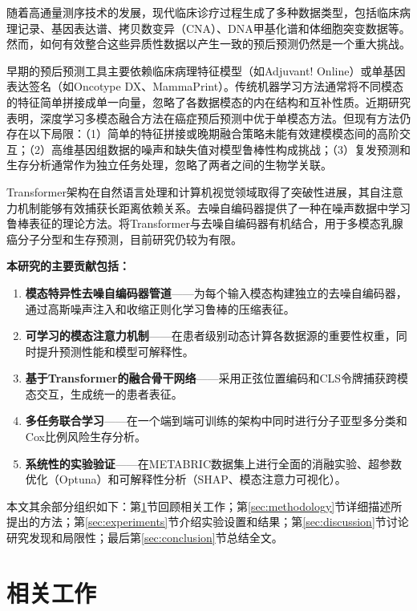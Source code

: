 \documentclass[conference]{IEEEtran}
\begin{document}
随着高通量测序技术的发展，现代临床诊疗过程生成了多种数据类型，包括临床病理记录、基因表达谱、拷贝数变异（CNA）、DNA甲基化谱和体细胞突变数据等。然而，如何有效整合这些异质性数据以产生一致的预后预测仍然是一个重大挑战。

早期的预后预测工具主要依赖临床病理特征模型（如Adjuvant! Online）或单基因表达签名（如Oncotype DX、MammaPrint）\cite{sparano2018adjuvant,cardoso201670gene}。传统机器学习方法通常将不同模态的特征简单拼接成单一向量，忽略了各数据模态的内在结构和互补性质。近期研究表明，深度学习多模态融合方法在癌症预后预测中优于单模态方法\cite{chen2022pan,huang2021multi}。但现有方法仍存在以下局限：（1）简单的特征拼接或晚期融合策略未能有效建模模态间的高阶交互；（2）高维基因组数据的噪声和缺失值对模型鲁棒性构成挑战；（3）复发预测和生存分析通常作为独立任务处理，忽略了两者之间的生物学关联。

Transformer架构在自然语言处理和计算机视觉领域取得了突破性进展，其自注意力机制能够有效捕获长距离依赖关系\cite{vaswani2017attention}。去噪自编码器提供了一种在噪声数据中学习鲁棒表征的理论方法\cite{vincent2008extracting}。将Transformer与去噪自编码器有机结合，用于多模态乳腺癌分子分型和生存预测，目前研究仍较为有限。

\textbf{本研究的主要贡献包括：}
\begin{enumerate}[label=(\arabic*)]
    \item \textbf{模态特异性去噪自编码器管道}——为每个输入模态构建独立的去噪自编码器，通过高斯噪声注入和收缩正则化学习鲁棒的压缩表征。
    \item \textbf{可学习的模态注意力机制}——在患者级别动态计算各数据源的重要性权重，同时提升预测性能和模型可解释性。
    \item \textbf{基于Transformer的融合骨干网络}——采用正弦位置编码和CLS令牌捕获跨模态交互，生成统一的患者表征。
    \item \textbf{多任务联合学习}——在一个端到端可训练的架构中同时进行分子亚型多分类和Cox比例风险生存分析。
    \item \textbf{系统性的实验验证}——在METABRIC数据集上进行全面的消融实验、超参数优化（Optuna）和可解释性分析（SHAP、模态注意力可视化）。
\end{enumerate}

本文其余部分组织如下：第\ref{sec:related}节回顾相关工作；第\ref{sec:methodology}节详细描述所提出的方法；第\ref{sec:experiments}节介绍实验设置和结果；第\ref{sec:discussion}节讨论研究发现和局限性；最后第\ref{sec:conclusion}节总结全文。

\section{相关工作}
\label{sec:related}
\end{document}
